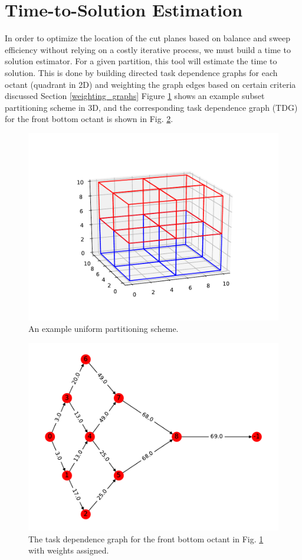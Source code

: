 \documentclass[11pt, letterpaper,titlepage,oneside]{article}
\begin{document}
\section{Time-to-Solution Estimation} \label{TOS}

In order to optimize the location of the cut planes based on balance and sweep efficiency without relying on a costly iterative process, we must build a time to solution estimator. For a given partition, this tool will estimate the time to solution. This is done by building directed task dependence graphs for each octant (quadrant in 2D) and weighting the graph edges based on certain criteria discussed Section \ref{weighting_graphs} Figure \ref{subset_plot} shows an example subset partitioning scheme in 3D, and the corresponding task dependence graph (TDG) for the front bottom octant is shown in Fig. \ref{digraph}.

\begin{figure}[H]
\centering
\includegraphics{../figures/subset_plot.pdf}
\caption{An example uniform partitioning scheme.}
\label{subset_plot}
\end{figure}

\begin{figure}[H]
\centering
\includegraphics{../figures/digraph.pdf}
\caption{The task dependence graph for the front bottom octant in Fig. \ref{subset_plot} with weights assigned.}
\label{digraph}
\end{figure}
\end{document}
